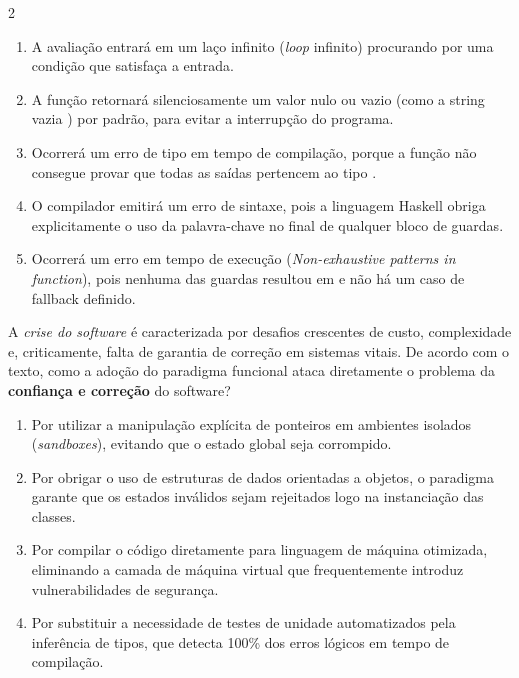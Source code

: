 \documentclass[a4paper,10pt,brazil]{article}
\begin{document}
\begin{multicols}{2}
\begin{enumerate}
  \item A avaliação entrará em um laço infinito (\emph{loop} infinito) procurando por uma condição que satisfaça a entrada.

  \item A função retornará silenciosamente um valor nulo ou vazio (como a string vazia ) por padrão, para evitar a interrupção do programa.

  \item Ocorrerá um erro de tipo em tempo de compilação, porque a função não consegue provar que todas as saídas pertencem ao tipo .

  \item O compilador emitirá um erro de sintaxe, pois a linguagem Haskell obriga explicitamente o uso da palavra-chave  no final de qualquer bloco de guardas.

  \item Ocorrerá um erro em tempo de execução (\emph{Non-exhaustive patterns in function}), pois nenhuma das guardas resultou em  e não há um caso de fallback definido.


\end{enumerate}

A \emph{crise do software} é caracterizada por desafios crescentes de custo, complexidade e, criticamente, falta de garantia de correção em sistemas vitais. De acordo com o texto, como a adoção do paradigma funcional ataca diretamente o problema da \textbf{confiança e correção} do software?

\begin{enumerate}
  \item Por utilizar a manipulação explícita de ponteiros em ambientes isolados (\emph{sandboxes}), evitando que o estado global seja corrompido.

  \item Por obrigar o uso de estruturas de dados orientadas a objetos, o paradigma garante que os estados inválidos sejam rejeitados logo na instanciação das classes.

  \item Por compilar o código diretamente para linguagem de máquina otimizada, eliminando a camada de máquina virtual que frequentemente introduz vulnerabilidades de segurança.

  \item Por substituir a necessidade de testes de unidade automatizados pela inferência de tipos, que detecta 100\% dos erros lógicos em tempo de compilação.


\end{enumerate}
\end{multicols}
\end{document}
